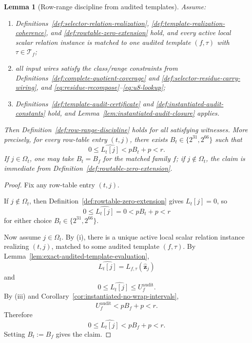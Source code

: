 ﻿\documentclass[11pt]{article}
\newtheorem{lemma}[theorem]{Lemma}
\newcommand{\wt}[1]{\widehat{#1}}
\begin{document}
\begin{lemma}[Row-range discipline from audited templates]
\label{lem:row-range-from-audit}
Assume:
\begin{enumerate}[label=(\roman*),leftmargin=2em]
    \item Definitions~\ref{def:selector-relation-realization},
    \ref{def:template-realization-coherence}, and
    \ref{def:rowtable-zero-extension} hold, and every active local scalar
    relation instance is matched to one audited template \((f,\tau)\) with
    \(\tau\in\mathcal T_f\);
    \item all input wires satisfy the class/range constraints from
    Definitions~\ref{def:complete-quotient-coverage} and
    \ref{def:selector-residue-carry-wiring}, and
    \eqref{eq:residue-recompose}--\eqref{eq:u8-lookup};
    \item Definitions~\ref{def:template-audit-certificate} and
    \ref{def:instantiated-audit-constants} hold, and
    Lemma~\ref{lem:instantiated-audit-closure} applies.
\end{enumerate}
Then Definition~\ref{def:row-range-discipline} holds for all satisfying
witnesses. More precisely, for every row-table entry \((t,j)\), there exists
\(B_t\in\{2^{31},2^{66}\}\) such that
\[
0 \le \wt{L_t[j]} < pB_t + p < r.
\]
If \(j\in\Omega_t\), one may take \(B_t=B_f\) for the matched family \(f\); if
\(j\notin\Omega_t\), the claim is immediate from
Definition~\ref{def:rowtable-zero-extension}.
\end{lemma}

\begin{proof}
Fix any row-table entry \((t,j)\).

If \(j\notin\Omega_t\), then
Definition~\ref{def:rowtable-zero-extension} gives \(L_t[j]=0\), so
\[
0\le \wt{L_t[j]}=0 < pB_t+p<r
\]
for either choice \(B_t\in\{2^{31},2^{66}\}\).

Now assume \(j\in\Omega_t\). By (i), there is a unique active local scalar
relation instance realizing \((t,j)\), matched to some audited template
\((f,\tau)\). By Lemma~\ref{lem:exact-audited-template-evaluation},
\[
\wt{L_t[j]} = L_{f,\tau}(\wt{\mathbf z}_j)
\]
and
\[
0\le \wt{L_t[j]}\le U_f^{\mathrm{audit}}.
\]
By (iii) and Corollary~\ref{cor:instantiated-no-wrap-intervals},
\[
U_f^{\mathrm{audit}} < pB_f+p < r.
\]
Therefore
\[
0\le \wt{L_t[j]} < pB_f+p<r.
\]
Setting \(B_t:=B_f\) gives the claim.
\end{proof}
\end{document}
